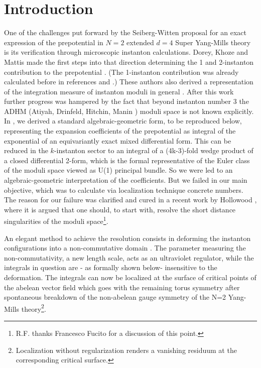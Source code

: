 \documentclass[a4paper,12pt]{article}
\begin{document}
\section{Introduction}
\renewcommand{\theequation}{1.\arabic{equation}}
One of the challenges put forward by the Seiberg-Witten proposal
\cite{sw1} for an exact expression of the prepotential in $N=2$
extended $d=4$ Super Yang-Mills theory is its verification through
microscopic instanton calculations. Dorey, Khoze and Mattis made
the first steps into that direction determining the 1 and
2-instanton contribution to the prepotential \cite{dorey1}. (The
1-instanton contribution was already calculated before in
references \cite{finnel} and \cite{ito}.) These authors also
derived a representation of the integration measure of instanton
moduli in general \cite{dorey3}. After this work further progress
was hampered by the fact that beyond instanton number 3 the ADHM
(Atiyah, Drinfeld, Hitchin, Manin \cite{adhm}) moduli space is not
known explicitly. In \cite{FPS1}, \cite{FPS2} we derived a
standard algebraic-geometric form, to be reproduced below,
representing the expansion coefficients of the prepotential as
integral of the exponential of an equivariantly exact mixed
differential form. This can be reduced  in the $k$-instanton
sector to an integral of a (4k-3)-fold wedge product of a closed
differential 2-form, which is the formal representative of the
Euler class of the moduli space viewed as U(1) principal bundle.
So we were led to an algebraic-geometric interpretation of the
coefficients. But we failed in our main objective, which was to
calculate via localization technique concrete numbers. The reason
for our failure was clarified and cured in a recent work by
Hollowood \cite{H}, where it is argued that one should, to start
with, resolve the short distance singularities of the moduli
space\footnote{ R.F. thanks Francesco Fucito for a discussion of
this point.}.

An elegant method to achieve the resolution consists in deforming
the instanton configurations into a non-commutative domain
\cite{NSch}. The parameter measuring the non-commutativity, a new
length scale, acts as an ultraviolet regulator, while the
integrals in question are - as formally shown below- insensitive
to the deformation. The integrals can now be localized at the
surface of critical points of the abelean vector field which goes
with the remaining torus symmetry after spontaneous breakdown of
the non-abelean gauge symmetry of the N=2 Yang-Mills
theory\footnote{Localization without regularization renders a
vanishing residuum at the corresponding critical surface.}.
\end{document}
